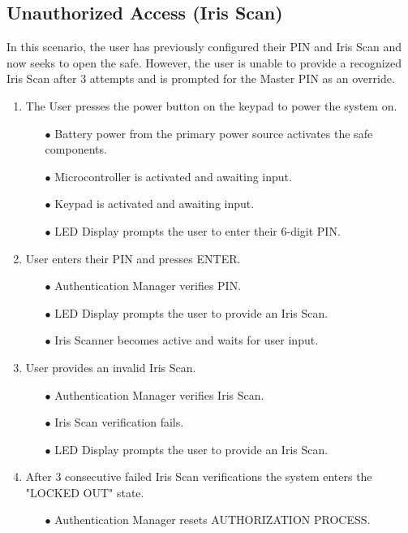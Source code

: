 \documentclass{article}
\begin{document}
\subsection{Unauthorized Access (Iris Scan)}
In this scenario, the user has previously configured their PIN and Iris Scan and now seeks to open the safe. However, the user is unable to provide a recognized Iris Scan after 3 attempts and is prompted for the Master PIN as an override.

\begin{enumerate}
    \item The User presses the power button on the keypad to power the system on.
    \begin{enumerate}
        \item[$\bullet$] Battery power from the primary power source activates the safe components.
        \item[$\bullet$] Microcontroller is activated and awaiting input.
        \item[$\bullet$] Keypad is activated and awaiting input.
        \item[$\bullet$] LED Display prompts the user to enter their 6-digit PIN.
    \end{enumerate}
    \item User enters their PIN and presses ENTER.
    \begin{enumerate}
        \item[$\bullet$] Authentication Manager verifies PIN.
        \item[$\bullet$] LED Display prompts the user to provide an Iris Scan.
        \item[$\bullet$] Iris Scanner becomes active and waits for user input.
    \end{enumerate}
    \item User provides an invalid Iris Scan. 
    \begin{enumerate}
        \item[$\bullet$] Authentication Manager verifies Iris Scan.
        \item[$\bullet$] Iris Scan verification fails.
        \item[$\bullet$] LED Display prompts the user to provide an Iris Scan.
    \end{enumerate}
    \item After 3 consecutive failed Iris Scan verifications the system enters the "LOCKED OUT" state.
    \begin{enumerate}
        \item[$\bullet$] Authentication Manager resets AUTHORIZATION PROCESS.

\end{enumerate}
\end{enumerate}
\end{document}
